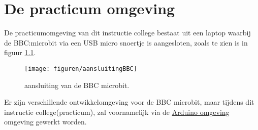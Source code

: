 \chapter{De practicum omgeving}
\label{chap:omgeving}
De practicumomgeving van dit instructie college bestaat uit een laptop waarbij de BBC:microbit via een USB micro snoertje is aangesloten, zoals te zien is in figuur \ref{fig:aansluiting}.
	\begin{figure}[h!]
	\captionsetup{justification=centering}
	\texttt{[image: figuren/aansluitingBBC]}
	\centering
	\caption{aansluiting van de BBC microbit.}
	\label{fig:aansluiting}
\end{figure}
Er zijn verschillende ontwikkelomgeving voor de BBC microbit, maar tijdens dit instructie college(practicum), zal voornamelijk via de \href{https://www.arduino.cc/en/software}{Arduino omgeving} omgeving gewerkt worden.



